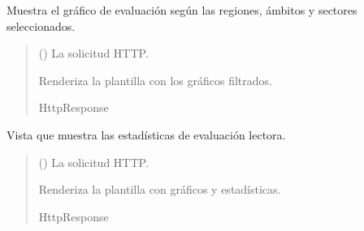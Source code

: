 \documentclass[letterpaper,10pt,spanish]{sphinxmanual}
\begin{document}
\begin{fulllineitems}

\pysigstartsignatures
{}
\pysigstopsignatures
\end{fulllineitems}



\begin{fulllineitems}

\pysigstartsignatures
{}
\pysigstopsignatures
\sphinxAtStartPar
Muestra el gráfico de evaluación según las regiones, ámbitos y sectores seleccionados.
\begin{quote}\begin{description}
\sphinxAtStartPar
{} () \textendash{} La solicitud HTTP.

\sphinxAtStartPar
Renderiza la plantilla con los gráficos filtrados.

\sphinxAtStartPar
HttpResponse

\end{description}\end{quote}

\end{fulllineitems}



\begin{fulllineitems}

\pysigstartsignatures
{}
\pysigstopsignatures
\sphinxAtStartPar
Vista que muestra las estadísticas de evaluación lectora.
\begin{quote}\begin{description}
\sphinxAtStartPar
{} () \textendash{} La solicitud HTTP.

\sphinxAtStartPar
Renderiza la plantilla con gráficos y estadísticas.

\sphinxAtStartPar
HttpResponse

\end{description}\end{quote}

\end{fulllineitems}
\end{document}
